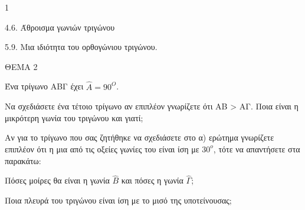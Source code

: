 \begin{ylh}{1}
    \item 4.6. Άθροισμα γωνιών τριγώνου
    \item 5.9. Μια ιδιότητα του ορθογώνιου τριγώνου.
\end{ylh}

ΘΕΜΑ 2

Ένα τρίγωνο ΑΒΓ έχει $\widehat{Α} = 90^{Ο}$.

\begin{alist}
\item Να σχεδιάσετε ένα τέτοιο τρίγωνο αν επιπλέον γνωρίζετε ότι ΑΒ \textgreater{} ΑΓ. Ποια είναι η μικρότερη γωνία του τριγώνου και γιατί; 

\item Αν για το τρίγωνο που σας ζητήθηκε να σχεδιάσετε στο α) ερώτημα γνωρίζετε επιπλέον ότι η μια από τις οξείες γωνίες του είναι ίση με $30^{ο}$, τότε να απαντήσετε στα παρακάτω:

\begin{rlist}
\item Πόσες μοίρες θα είναι η γωνία $\widehat{Β}$ και πόσες η γωνία $\widehat{\Gamma}$; 

\item Ποια πλευρά του τριγώνου είναι ίση με το μισό της υποτείνουσας; 
\end{rlist}
\end{alist}
